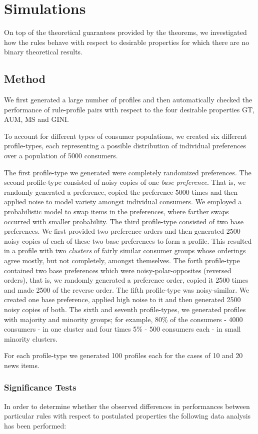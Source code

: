 \documentclass{article}
\begin{document}
\section{Simulations}%
On top of the theoretical guarantees provided by the theorems, we investigated how the rules behave with respect to desirable properties for which there are no binary theoretical results.
\subsection{Method}
We first generated a large number of profiles and then automatically checked the performance of rule-profile pairs with respect to the four desirable properties GT, AUM, MS and GINI.

To account for different types of consumer populations, we created six different profile-types, each representing a possible distribution of individual preferences over a population of 5000 consumers.

The first profile-type we generated were completely randomized preferences.
The second profile-type consisted of noisy copies of one \emph{base preference}. That is, we randomly generated a preference, copied the preference 5000 times and then applied noise to model variety amongst individual consumers. We employed a probabilistic model to swap items in the preferences, where farther swaps occurred with smaller probability.
The third profile-type consisted of two base preferences. We first provided two preference orders and then generated 2500 noisy copies of each of these two base preferences to form a profile. This resulted in a profile with two \emph{clusters} of fairly similar consumer groups whose orderings agree mostly, but not completely, amongst  themselves.
The forth profile-type contained two base preferences which were noisy-polar-opposites (reversed orders), that is, we randomly generated a preference order, copied it 2500 times and made 2500 of the reverse order.
The fifth profile-type was noisy-similar. We created one base preference, applied high noise to it and then generated 2500 noisy copies of both.
The sixth and seventh profile-types, we generated profiles with majority and minority groups; for example, 80\% of the consumers - 4000 consumers - in one cluster and four times 5\% - 500 consumers each - in small minority clusters.

For each profile-type we generated 100 profiles each for the cases of 10 and 20 news items.
\subsubsection{Significance Tests}
In order to determine whether the observed differences in performances between particular rules with respect to postulated properties the following data analysis has been performed:
\end{document}
